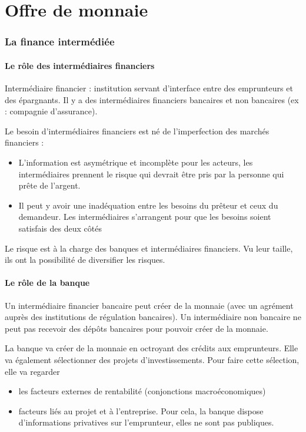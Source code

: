 \part{Offre de monnaie}

\section{La finance intermédiée}

	\subsection{Le rôle des intermédiaires financiers}
	
	Intermédiaire financier : institution servant d'interface entre des emprunteurs et des épargnants. Il y a des intermédiaires financiers bancaires et non bancaires (ex : compagnie d'assurance).
	
	Le besoin d'intermédiaires financiers est né de l'imperfection des marchés financiers :
	
	\begin{itemize}
		\item L'information est asymétrique et incomplète pour les acteurs, les intermédiaires prennent le risque qui devrait être pris par la personne qui prête de l'argent.
	
		\item Il peut y avoir une inadéquation entre les besoins du prêteur et ceux du demandeur. Les intermédiaires s'arrangent pour que les besoins soient satisfais des deux côtés
\end{itemize}
	Le risque est à la charge des banques et intermédiaires financiers. Vu leur taille, ils ont la possibilité de diversifier les risques.
	
	
	\subsection{Le rôle de la banque}
	
	Un intermédiaire financier bancaire peut créer de la monnaie (avec un agrément auprès des institutions de régulation bancaires). Un intermédiaire non bancaire ne peut pas recevoir des dépôts bancaires pour pouvoir créer de la monnaie.
	
	La banque va créer de la monnaie en octroyant des crédits aux emprunteurs. Elle va également sélectionner des projets d'investissements. Pour faire cette sélection, elle va regarder
	
	\begin{itemize}
		\item les facteurs externes de rentabilité (conjonctions macroéconomiques)
		\item facteurs liés  au projet et à l'entreprise. Pour cela, la banque dispose d'informations privatives sur l'emprunteur, elles ne sont pas publiques.
	\end{itemize}
	
